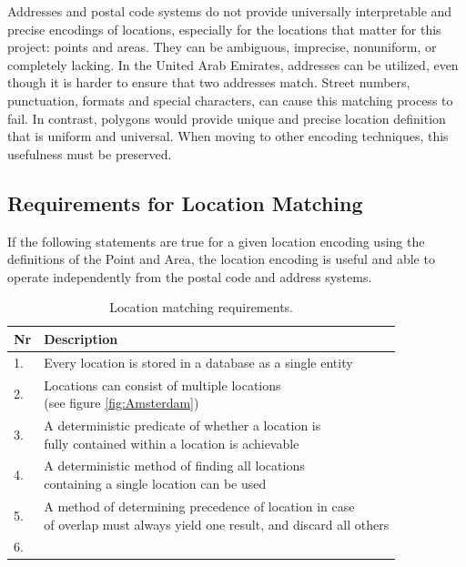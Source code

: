 Addresses and postal code systems do not provide universally interpretable and precise encodings of locations, especially for the locations that matter for this project: points and areas. They can be ambiguous, imprecise, nonuniform, or completely lacking. In the United Arab Emirates, addresses can be utilized, even though it is harder to ensure that two addresses match. Street numbers, punctuation, formats and special characters, can cause this matching process to fail. In contrast, polygons would provide unique and precise location definition that is uniform and universal. When moving to other encoding techniques, this usefulness must be preserved.

\subsection{Requirements for Location Matching}
If the following statements are true for a given location encoding using the definitions of the Point and Area, the location encoding is useful and able to operate independently from the postal code and address systems.

\begin{table}[htbp!]
	\centering
	\begin{tabular}{l|l}
		\toprule
		Nr & Description \\
		\midrule
		1. & Every location is stored in a database as a single entity \\
		\hline
		2. & \makecell[l]{Locations can consist of multiple locations \\
			(see figure \ref{fig:Amsterdam})} \\
		\hline
		3. & \makecell[l]{A deterministic predicate of whether a location is \\
			fully contained within a location is achievable} \\
		\hline
		4. & \makecell[l]{A deterministic method of finding all locations \\
			containing a single location can be used} \\
		\hline
		5. & \makecell[l]{A method of determining precedence of location in case \\
			of overlap must always yield one result, and discard all others} \\
		\hline
		6. & \makecell[l]{Locations must be importable from external sources} \\
		\bottomrule
	\end{tabular}
	\caption[Location Matching Requirements]{Location matching requirements.}
	\label{tab:location-matching-requirements}
\end{table}

